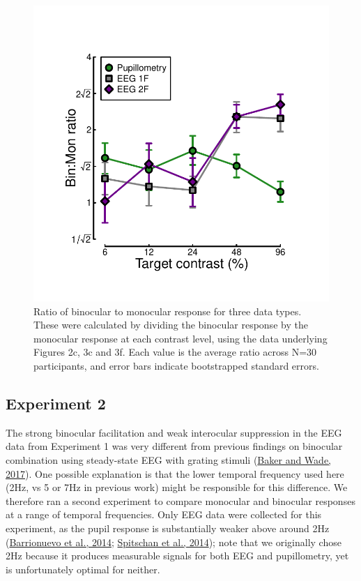 \documentclass[
]{article}
\begin{document}
\begin{figure}

{\centering \includegraphics[width=0.5\linewidth]{Figures/BSratios} 

}

\caption{Ratio of binocular to monocular response for three data types. These were calculated by dividing the binocular response by the monocular response at each contrast level, using the data underlying Figures 2c, 3c and 3f. Each value is the average ratio across N=30 participants, and error bars indicate bootstrapped standard errors.}\label{fig:BSratios}
\end{figure}

\hypertarget{experiment-2}{%
\subsection{Experiment 2}\label{experiment-2}}

The strong binocular facilitation and weak interocular suppression in the EEG data from Experiment 1 was very different from previous findings on binocular combination using steady-state EEG with grating stimuli (\protect\hyperlink{ref-Baker2017}{Baker and Wade, 2017}). One possible explanation is that the lower temporal frequency used here (2Hz, vs 5 or 7Hz in previous work) might be responsible for this difference. We therefore ran a second experiment to compare monocular and binocular responses at a range of temporal frequencies. Only EEG data were collected for this experiment, as the pupil response is substantially weaker above around 2Hz (\protect\hyperlink{ref-Barrionuevo2014}{Barrionuevo et al., 2014}; \protect\hyperlink{ref-Spitschan2014}{Spitschan et al., 2014}); note that we originally chose 2Hz because it produces measurable signals for both EEG and pupillometry, yet is unfortunately optimal for neither.
\end{document}
